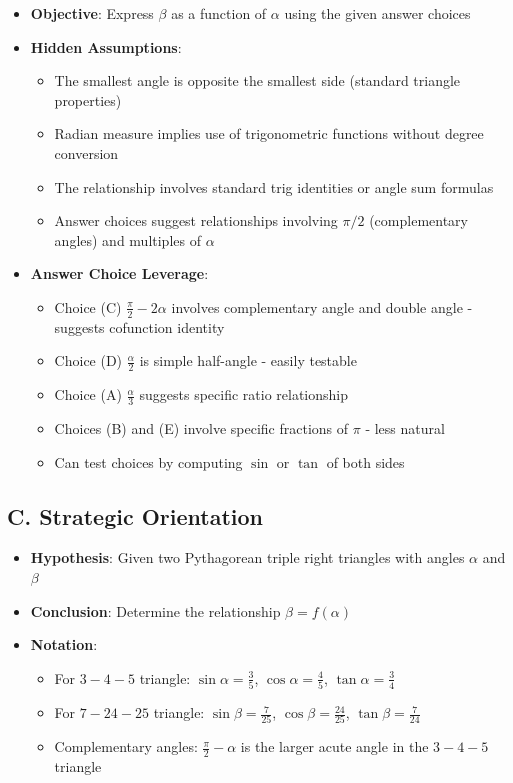 \documentclass[11pt]{article}
\begin{document}
\begin{problemconfigbox}
\begin{itemize}[leftmargin=*]
    \item \textbf{Objective}: Express $\beta$ as a function of $\alpha$ using the given answer choices
    
    \item \textbf{Hidden Assumptions}: 
    \begin{itemize}
        \item The smallest angle is opposite the smallest side (standard triangle properties)
        \item Radian measure implies use of trigonometric functions without degree conversion
        \item The relationship involves standard trig identities or angle sum formulas
        \item Answer choices suggest relationships involving $\pi/2$ (complementary angles) and multiples of $\alpha$
    \end{itemize}
    
    \item \textbf{Answer Choice Leverage}: 
    \begin{itemize}
        \item Choice (C) $\frac{\pi}{2} - 2\alpha$ involves complementary angle and double angle - suggests cofunction identity
        \item Choice (D) $\frac{\alpha}{2}$ is simple half-angle - easily testable
        \item Choice (A) $\frac{\alpha}{3}$ suggests specific ratio relationship
        \item Choices (B) and (E) involve specific fractions of $\pi$ - less natural
        \item Can test choices by computing $\sin$ or $\tan$ of both sides
    \end{itemize}
\end{itemize}

\subsection*{C. Strategic Orientation}
\begin{itemize}[leftmargin=*]
    \item \textbf{Hypothesis}: Given two Pythagorean triple right triangles with angles $\alpha$ and $\beta$
    \item \textbf{Conclusion}: Determine the relationship $\beta = f(\alpha)$
    \item \textbf{Notation}: 
    \begin{itemize}
        \item For $3{-}4{-}5$ triangle: $\sin\alpha = \frac{3}{5}$, $\cos\alpha = \frac{4}{5}$, $\tan\alpha = \frac{3}{4}$
        \item For $7{-}24{-}25$ triangle: $\sin\beta = \frac{7}{25}$, $\cos\beta = \frac{24}{25}$, $\tan\beta = \frac{7}{24}$
        \item Complementary angles: $\frac{\pi}{2} - \alpha$ is the larger acute angle in the $3{-}4{-}5$ triangle
    \end{itemize}
    

\end{itemize}
\end{problemconfigbox}
\end{document}
